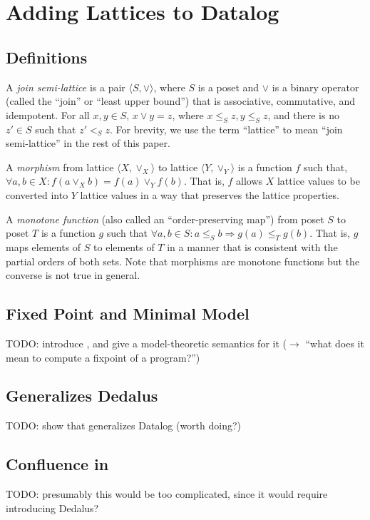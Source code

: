 \section{Adding Lattices to Datalog}
\label{sec:foundation}

\subsection{Definitions}

A \emph{join semi-lattice} is a pair $\langle S, \lor \rangle$, where $S$ is a
poset and $\lor$ is a binary operator (called the ``join'' or ``least upper
bound'') that is associative, commutative, and idempotent. For all $x, y \in S$,
$x \lor y = z$, where $x \leq_S z, y \leq_S z$, and there is no $z' \in S$ such
that $z' <_S z$. For brevity, we use the term ``lattice'' to mean ``join
semi-lattice'' in the rest of this paper.

A \emph{morphism} from lattice $\langle X, \lor_X\rangle$ to lattice $\langle Y,
\lor_Y\rangle$ is a function $f$ such that, $\forall a,b \in X: f(a \lor_X b) =
f(a) \lor_Y f(b)$. That is, $f$ allows $X$ lattice values to be converted into
$Y$ lattice values in a way that preserves the lattice properties.

A \emph{monotone function} (also called an ``order-preserving map'') from poset
$S$ to poset $T$ is a function $g$ such that $\forall a,b \in S: a \leq_S b
\Rightarrow g(a) \leq_T g(b)$. That is, $g$ maps elements of $S$ to elements of
$T$ in a manner that is consistent with the partial orders of both sets. Note
that morphisms are monotone functions but the converse is not true in general.

\subsection{Fixed Point and Minimal Model}

TODO: introduce \baselang, and give a model-theoretic semantics for it ($\to$
``what does it mean to compute a fixpoint of a \baselang program?'')

\subsection{\baselang Generalizes Dedalus}

TODO: show that \baselang generalizes Datalog (worth doing?)

\subsection{Confluence in \baselang}

TODO: presumably this would be too complicated, since it would require
introducing Dedalus?
